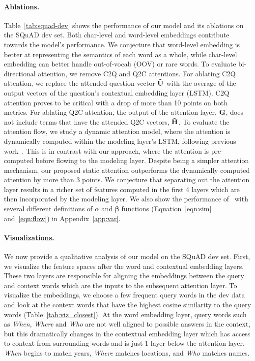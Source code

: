 \paragraph{Ablations.} Table~\ref{tab:squad-dev} shows the performance of our model and its ablations on the SQuAD dev set. Both char-level and word-level embeddings contribute towards the model's performance. We conjecture that word-level embedding is better at representing the semantics of each word as a whole, while char-level embedding can better handle out-of-vocab (OOV) or rare words. To evaluate bi-directional attention, we remove C2Q and Q2C attentions. For ablating C2Q attention, we replace the attended question vector $\tilde{\bf U}$ with the average of the output vectors of the question's contextual embedding layer (LSTM). C2Q attention proves to be critical with a drop of more than 10 points on both metrics. For ablating Q2C attention, the output of the attention layer, ${\bf G}$, does not include terms that have the attended Q2C vectors, $\tilde{\bf H}$. To evaluate the attention flow, we study a dynamic attention model, where the attention is dynamically computed within the modeling layer's LSTM, following previous work~\citep{Bahdanau2014NeuralMT,wang2016machine}. This is in contrast with our approach, where the attention is pre-computed before flowing to the modeling layer. Despite being a simpler attention mechanism, our proposed static attention outperforms the dynamically computed attention by more than 3 points. We conjecture that separating out the attention layer results in a richer set of features computed in the first 4 layers which are then incorporated by the modeling layer.
We also show the performance of \sysshort\ with several different definitions of $\alpha$ and ${\bm \beta}$ functions (Equation~\ref{eqn:sim} and~\ref{eqn:flow}) in Appendix~\ref{app:var}.

\paragraph{Visualizations.} We now provide a qualitative analysis of our model on the SQuAD dev set. First, we visualize the feature spaces after the word and contextual embedding layers. These two layers are responsible for aligning the embeddings between the query and context words which are the inputs to the subsequent attention layer. To visualize the embeddings, we choose a few frequent query words in the dev data and look at the context words that have the highest cosine similarity to the query words (Table~\ref{tab:viz_closest}). At the word embedding layer, query words such as \textit{When}, \textit{Where} and \textit{Who} are not well aligned to possible answers in the context, but this dramatically changes in the contextual embedding layer which has access to context from surrounding words and is just 1 layer below the attention layer. \textit{When} begins to match years, \textit{Where} matches locations, and \textit{Who} matches names. 

